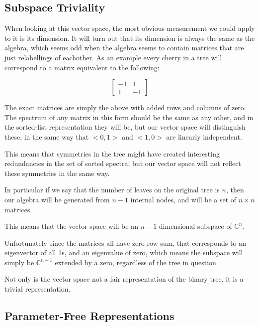 \documentclass{report}
\begin{document}

\subsection{Subspace Triviality}

When looking at this vector space, the most obvious measurement we could apply
to it is its dimension.
It will turn out that its dimension is always the same as the algebra, which
seems odd when the algebra seems to contain matrices that are just relabellings
of eachother.
As an example every cherry in a tree will correspond to a matrix equivalent to
the following:

\[
	\left[ \begin{matrix}
		-1 & 1\\
		1 & -1
	\end{matrix} \right]
\]

The exact matrices are simply the above with added rows and columns of zero.
The spectrum of any matrix in this form should be the same as any other, and in
the sorted-list representation they will be, but our vector space will
distinguish these, in the same way that $<0, 1>$ and $<1, 0>$ are linearly
independent.

This means that symmetries in the tree might have created interesting
redundancies in the set of sorted spectra, but our vector space will not
reflect these symmetries in the same way.

In particular if we say that the number of leaves on the original tree is $n$,
then our algebra will be generated from $n-1$ internal nodes, and will be a set
of $n \times n$ matrices.

This means that the vector space will be an $n-1$ dimensional subspace of
$\mathds{C}^n$.

Unfortunately since the matrices all have zero row-sum, that corresponds to an
eigenvector of all 1s, and an eigenvalue of zero, which means the subspace will
simply be $\mathds{C}^{n-1}$ extended by a zero, regardless of the tree in
question.

Not only is the vector space not a fair representation of the binary tree, it
is a trivial representation.

\subsection{Parameter-Free Representations}
\end{document}
